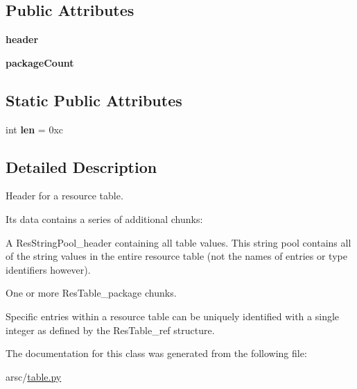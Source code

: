 \subsection*{Public Attributes}
\begin{DoxyCompactItemize}
\item 
\mbox{\label{classtable_1_1ResTable__header_a4a0f5a3a176d92c50f1ad0e54db966b0}} 
{\bfseries header}
\item 
\mbox{\label{classtable_1_1ResTable__header_a117ed35d193fe748f388ea695015b809}} 
{\bfseries package\+Count}
\end{DoxyCompactItemize}
\subsection*{Static Public Attributes}
\begin{DoxyCompactItemize}
\item 
\mbox{\label{classtable_1_1ResTable__header_a3f5f58adc37bd530a3c3027c392b302c}} 
int {\bfseries len} = 0xc
\end{DoxyCompactItemize}


\subsection{Detailed Description}
Header for a resource table. 

Its data contains a series of additional chunks\+:
\begin{DoxyItemize}
\item A Res\+String\+Pool\+\_\+header containing all table values. This string pool contains all of the string values in the entire resource table (not the names of entries or type identifiers however).
\item One or more Res\+Table\+\_\+package chunks.
\end{DoxyItemize}

Specific entries within a resource table can be uniquely identified with a single integer as defined by the Res\+Table\+\_\+ref structure. 

The documentation for this class was generated from the following file\+:\begin{DoxyCompactItemize}
\item 
arsc/\mbox{\hyperlink{table_8py}{table.\+py}}\end{DoxyCompactItemize}
